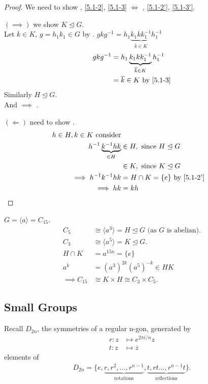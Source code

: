\begin{proof}
  We need to show , \ref{5.1-2}, \ref{5.1-3} $\iff$ , \ref{5.1-2'}, \ref{5.1-3'}.

  $(\implies)$ we show $K \trianglelefteq G$.\\
  Let $k \in K$, $g = h_1 k_1 \in G$ by .
  $g k g^{-1} = h_1 \underbrace{k_1 k k_1^{-1}}_{\overline{k} \in K} h_1^{-1}$
  \begin{align*}
    g k g^{-1} &= h_1 \underbrace{k_1 k k_1^{-1}}_{\overline{k} \in K} h_1^{-1} \\
    &= \overline{k} \in K \text{ by } \Cref{5.1-3}
  \end{align*} 
  Similarly $H \trianglelefteq G$. \\
  And  $\implies$ .

  $(\Longleftarrow)$ need to show .
  \begin{align*}
    h \in H, k \in K \text{ consider} \\
    h^{-1} \underbrace{k^{-1} h k}_{\in H} &\in H, \text{ since } H \trianglelefteq G \\
    &\in K, \text{ since } K \trianglelefteq G \\
    \implies h^{-1}k^{-1} h k &= H \cap K = \{ e \} \text{ by \Cref{5.1-2'}} \\
    \implies hk &= kh 
  \end{align*} 
\end{proof} 

\begin{example}
$G = \langle a \rangle = C_{15}$.
  \begin{align*}
    C_5 &\cong \langle a^3 \rangle = H \trianglelefteq G \text{ (as $G$ is abelian)}. \\
    C_3 &\cong \langle a^5 \rangle = K \trianglelefteq G. \\
    H \cap K &= a^{15n} = \{ e \} \\
    a^k &= (a^3)^{2k} (a^5)^{-k} \in HK \\
    \implies C_{15} &\cong K \times H \cong C_3 \times C_5.
  \end{align*} 
\end{example} 

\subsection{Small Groups}

Recall $D_{2n}$, the symmetries of a regular n-gon, generated by 
\begin{align*}
  r : z &\mapsto e^{2 \pi i / n} z \\
  t : z &\mapsto \overline{z} 
\end{align*} 
elements of \begin{align*}
  D_{2n} = \{e, \underbrace{r, r^2, \ldots, r^{n-1}}_\text{rotations}, \underbrace{t, rt \ldots, r^{n-1}t}_\text{reflections} \}.
\end{align*}

